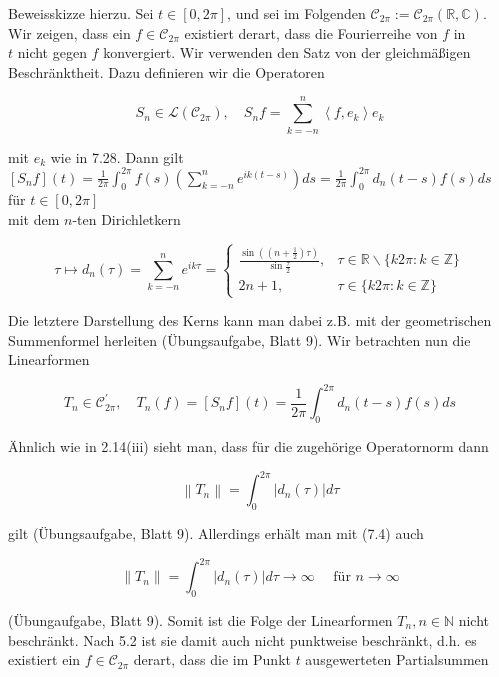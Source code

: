 \documentclass[10pt, letterpaper]{article}
\begin{document}
Beweisskizze hierzu. Sei $t \in[0,2 \pi]$, und sei im Folgenden $\mathcal{C}_{2 \pi}:=\mathcal{C}_{2 \pi}(\mathbb{R}, \mathbb{C})$. Wir zeigen, dass ein $f \in \mathcal{C}_{2 \pi}$ existiert derart, dass die Fourierreihe von $f$ in\\
$t$ nicht gegen $f$ konvergiert. Wir verwenden den Satz von der gleichmäßigen Beschränktheit. Dazu definieren wir die Operatoren

$$
S_{n} \in \mathcal{L}\left(\mathcal{C}_{2 \pi}\right), \quad S_{n} f=\sum_{k=-n}^{n}\left\langle f, e_{k}\right\rangle e_{k}
$$

mit $e_{k}$ wie in 7.28. Dann gilt\\
$\left[S_{n} f\right](t)=\frac{1}{2 \pi} \int_{0}^{2 \pi} f(s)\left(\sum_{k=-n}^{n} e^{i k(t-s)}\right) d s=\frac{1}{2 \pi} \int_{0}^{2 \pi} d_{n}(t-s) f(s) d s \quad$ für $t \in[0,2 \pi]$\\
mit dem $n$-ten Dirichletkern

$$
\tau \mapsto d_{n}(\tau)=\sum_{k=-n}^{n} e^{i k \tau}= \begin{cases}\frac{\sin \left(\left(n+\frac{1}{2}\right) \tau\right)}{\sin \frac{\tau}{2}}, & \tau \in \mathbb{R} \backslash\{k 2 \pi: k \in \mathbb{Z}\} \\ 2 n+1, & \tau \in\{k 2 \pi: k \in \mathbb{Z}\}\end{cases}
$$

Die letztere Darstellung des Kerns kann man dabei z.B. mit der geometrischen Summenformel herleiten (Übungsaufgabe, Blatt 9). Wir betrachten nun die Linearformen

$$
T_{n} \in \mathcal{C}_{2 \pi}^{\prime}, \quad T_{n}(f)=\left[S_{n} f\right](t)=\frac{1}{2 \pi} \int_{0}^{2 \pi} d_{n}(t-s) f(s) d s
$$

Ähnlich wie in 2.14(iii) sieht man, dass für die zugehörige Operatornorm dann

$$
\left\|T_{n}\right\|=\int_{0}^{2 \pi}\left|d_{n}(\tau)\right| d \tau
$$

gilt (Übungsaufgabe, Blatt 9). Allerdings erhält man mit (7.4) auch

$$
\left\|T_{n}\right\|=\int_{0}^{2 \pi}\left|d_{n}(\tau)\right| d \tau \rightarrow \infty \quad \text { für } n \rightarrow \infty
$$

(Übungaufgabe, Blatt 9). Somit ist die Folge der Linearformen $T_{n}, n \in \mathbb{N}$ nicht beschränkt. Nach 5.2 ist sie damit auch nicht punktweise beschränkt, d.h. es existiert ein $f \in \mathcal{C}_{2 \pi}$ derart, dass die im Punkt $t$ ausgewerteten Partialsummen
\end{document}
